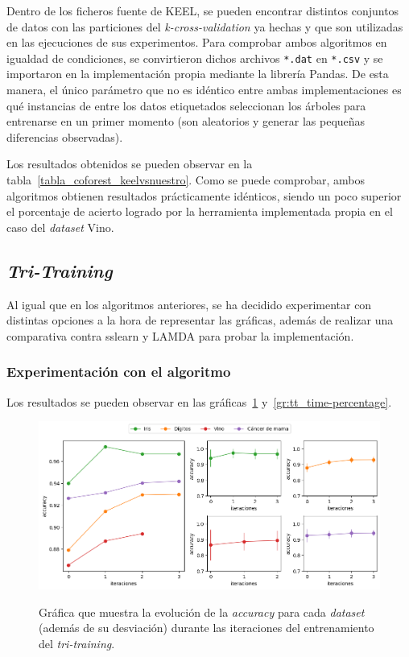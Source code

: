 Dentro de los ficheros fuente de KEEL, se pueden encontrar distintos conjuntos de datos con las particiones del \textit{k-cross-validation} ya hechas y que son utilizadas en las ejecuciones de sus experimentos. Para comprobar ambos algoritmos en igualdad de condiciones, se convirtieron dichos archivos \texttt{*.dat} en \texttt{*.csv} y se importaron en la implementación propia mediante la librería Pandas. De esta manera, el único parámetro que no es idéntico entre ambas implementaciones es qué instancias de entre los datos etiquetados seleccionan los árboles para entrenarse en un primer momento (son aleatorios y generar las pequeñas diferencias observadas).

Los resultados obtenidos se pueden observar en la tabla~\ref{tabla_coforest_keelvsnuestro}. Como se puede comprobar, ambos algoritmos obtienen resultados prácticamente idénticos, siendo un poco superior el porcentaje de acierto logrado por la herramienta implementada propia en el caso del \textit{dataset} Vino.


\subsection{\textit{Tri-Training}}

Al igual que en los algoritmos anteriores, se ha decidido experimentar con distintas opciones a la hora de representar las gráficas, además de realizar una comparativa contra sslearn y LAMDA para probar la implementación.


\subsubsection{Experimentación con el algoritmo}

Los resultados se pueden observar en las gráficas~\ref{gr:tt_train-iterations} y~\ref{gr:tt_time-percentage}.

\begin{figure}[h]
	\caption[\textit{Tri-training}: resultados experimentación (iteraciones-entrenamiento)]{Gráfica que muestra la evolución de la \textit{accuracy} para cada \textit{dataset} (además de su desviación) durante las iteraciones del entrenamiento del \textit{tri-training}.}
	\centering
	\includegraphics[scale=0.5]{../img/memoria/5_tritraining_score-iteraciones}
	\label{gr:tt_train-iterations}
\end{figure}


